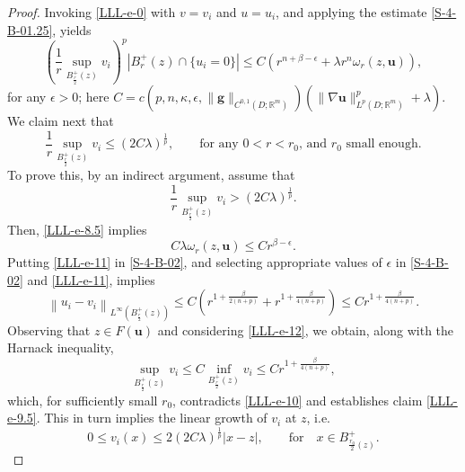 \documentclass{amsart}
\begin{document}
\begin{proof}

Invoking \eqref{LLL-e-0} with $v=v_i$ and $u=u_i$, and applying the estimate \eqref{S-4-B-01.25}, yields
\begin{equation}
\label{LLL-e-8.5}
\left( \frac{1}{r} \sup_{B_{\frac{r}{2}}^+(z)} v_i \right)^p \left| B_r^+(z) \cap \{ u_i =0 \} \right| \leq C \left(  r^{n+\beta-\epsilon} + \lambda r^n\omega_r(z,\mathbf{u}) \right),
\end{equation}
 for any $\epsilon >0 $; here  $C=c(p, n, \kappa, \epsilon,\|\mathbf{g}\|_{C^{0,1}(D;\mathbb{R}^m)}) \left( \| \nabla \mathbf{u} \|^p_{L^p(D; \mathbb{R}^m)}+\lambda \right)$.
We claim next that 
\begin{equation}
\label{LLL-e-9.5}
\frac{1}{r} \sup_{B_{\frac{r}{2}}^+(z)} v_i \leq  (2C\lambda)^{\frac1p}, \qquad \text{for any $0<r<r_0$, and $r_0$ small enough}.
\end{equation}
To prove this, by an indirect argument, assume that 
\begin{equation}
\label{LLL-e-10}
\frac{1}{r} \sup_{B_{\frac{r}{2}}^+(z)} v_i > (2C\lambda)^{\frac1p}.
\end{equation}
Then, \eqref{LLL-e-8.5} implies
\begin{equation}
\label{LLL-e-11}
C\lambda \omega_{r}(z,\mathbf{u}) \leq C r^{\beta-\epsilon}.
\end{equation}
Putting \eqref{LLL-e-11} in \eqref{S-4-B-02}, and selecting appropriate values of $\epsilon$ in \eqref{S-4-B-02} and \eqref{LLL-e-11}, implies
\begin{equation}
\label{LLL-e-12}
\left\| u_i  - v_i \right\|_{L^{\infty}(B_{\frac{r}{2}}^+(z))} \leq C \left(  r^{1+\frac{\beta}{2(n+p)}} +  r^{1+\frac{\beta}{4(n+p)}} \right) \leq C r^{1+\frac{\beta}{4(n+p)}}.
\end{equation}
Observing that $z \in F(\mathbf{u})$ and considering \eqref{LLL-e-12}, we obtain, along with the Harnack inequality, 
$$ \sup_{B_{\frac{r}{2}}^+(z)} v_i \leq C \inf_{B_{\frac{r}{2}}^+(z)} v_i \leq C r^{1+\frac{\beta}{4(n+p)}}, $$
which, for sufficiently small $r_0$,  
contradicts \eqref{LLL-e-10} and establishes  claim \eqref{LLL-e-9.5}.
This in turn implies the linear growth of $v_i$ at $z$, i.e.
\begin{equation}
\label{LLL-LG}
0 \leq v_i(x) \leq 2(2C\lambda)^{\frac1p} |x-z|, \qquad \text{for} \quad x \in B_{\frac{r_0}2(z)}^+.
\end{equation}


\end{proof}
\end{document}

